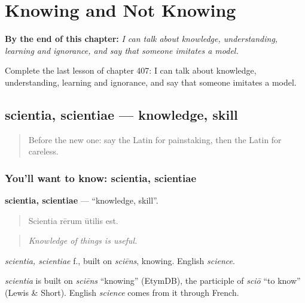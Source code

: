 
\chapter{Knowing and Not Knowing}
\label{ch:la-knowing-and-not-knowing}

\begin{chapteropening}
\textbf{By the end of this chapter:} \emph{I can talk about knowledge, understanding, learning and ignorance, and say that someone imitates a model.}

Complete the last lesson of chapter 407: I can talk about knowledge, understanding, learning and ignorance, and say that someone imitates a model.
\end{chapteropening}

\section[scientia, scientiae]{scientia, scientiae — knowledge, skill}

\label{lesson:LA-C407-scientia}



\begin{quote}
Before the new one: say the Latin for painstaking, then the Latin for careless.
\end{quote}

\subsection*{You'll want to know: scientia, scientiae}
\textbf{scientia, scientiae} — \textquotedblleft{}knowledge, skill\textquotedblright{}.

\begin{quote}
Scientia rērum ūtilis est.
\end{quote}

\begin{quote}
\emph{Knowledge of things is useful.}
\end{quote}

\emph{scientia, scientiae} f., built on \emph{sciēns}, knowing. English \emph{science}.

\begin{cousinweb}
\emph{scientia} is built on \emph{sciēns} \textquotedblleft{}knowing\textquotedblright{} (EtymDB), the participle of \emph{sciō} \textquotedblleft{}to know\textquotedblright{} (Lewis \& Short). English \emph{science} comes from it through French.
\end{cousinweb}

